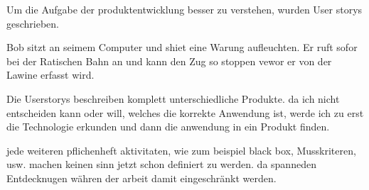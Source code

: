Um die Aufgabe der produktentwicklung besser zu verstehen, wurden User storys geschrieben.


Bob sitzt an seimem Computer und shiet eine Warung aufleuchten. Er ruft sofor bei der Ratischen Bahn an und kann den Zug so stoppen vewor er von der Lawine erfasst wird.


Die Userstorys beschreiben komplett unterschiedliche Produkte. da ich nicht entscheiden kann oder will, welches die korrekte Anwendung ist, werde ich zu erst die Technologie erkunden und dann die anwendung in ein Produkt finden.

jede weiteren pflichenheft aktivitaten, wie zum beispiel black box, Musskriteren, usw. machen keinen sinn jetzt schon definiert zu werden. da spanneden Entdecknugen währen der arbeit damit eingeschränkt werden.

